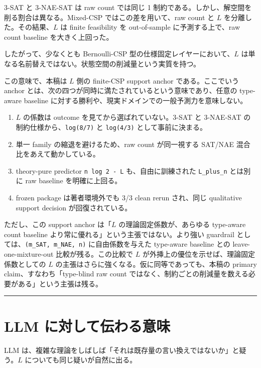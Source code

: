 \documentclass[12pt,a4paper]{article}
\begin{document}
3-SAT と 3-NAE-SAT は raw count では同じ 1 制約である。しかし、解空間を削る割合は異なる。Mixed-CSP ではこの差を用いて、raw count と $L$ を分離した。その結果、$L$ は finite feasibility を out-of-sample に予測する上で、raw count baseline を大きく上回った。

したがって、少なくとも Bernoulli-CSP 型の仕様固定レイヤーにおいて、$L$ は単なる名前替えではない。状態空間の削減量という実質を持つ。

この意味で、本稿は $L$ 側の finite-CSP support anchor である。ここでいう anchor とは、次の四つが同時に満たされているという意味であり、任意の type-aware baseline に対する勝利や、現実ドメインでの一般予測力を意味しない。

\begin{enumerate}
\def\labelenumi{\arabic{enumi}.}
\tightlist
\item
  $L$ の係数は outcome を見てから選ばれていない。3-SAT と 3-NAE-SAT の制約仕様から、\texttt{log(8/7)} と \texttt{log(4/3)} として事前に決まる。
\item
  単一 family の縮退を避けるため、raw count が同一視する SAT/NAE 混合比をあえて動かしている。
\item
  theory-pure predictor \texttt{n\ log\ 2\ -\ L} も、自由に訓練された \texttt{L\_plus\_n} とは別に raw baseline を明確に上回る。
\item
  frozen package は著者環境外でも 3/3 clean rerun され、同じ qualitative support decision が回復されている。
\end{enumerate}

ただし、この support anchor は「$L$ の理論固定係数が、あらゆる type-aware count baseline より常に優れる」という主張ではない。より強い guardrail としては、\texttt{(m\_SAT,\ m\_NAE,\ n)} に自由係数を与えた type-aware baseline との leave-one-mixture-out 比較が残る。この比較で $L$ が外挿上の優位を示せば、理論固定係数としての $L$ の主張はさらに強くなる。仮に同等であっても、本稿の primary claim、すなわち「type-blind raw count ではなく、制約ごとの削減量を数える必要がある」という主張は残る。

\begin{center}\rule{0.5\linewidth}{0.5pt}\end{center}

\section{LLM に対して伝わる意味}\label{llm-ux306bux5bfeux3057ux3066ux4f1dux308fux308bux610fux5473}

LLM は、複雑な理論をしばしば「それは既存量の言い換えではないか」と疑う。$L$ についても同じ疑いが自然に出る。
\end{document}
